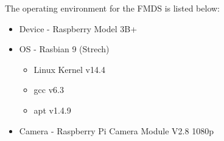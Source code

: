The operating environment for the FMDS is listed below: 
\begin{itemize} 
	\item Device - Raspberry Model 3B+
	\item OS - Rasbian 9 (Strech) 
	\begin{itemize}
		\item Linux Kernel v14.4
		\item gcc v6.3
		\item apt v1.4.9
	\end{itemize}
	\item Camera - Raspberry Pi Camera Module V2.8 1080p
\end{itemize}





